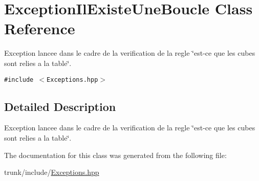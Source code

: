 \hypertarget{classExceptionIlExisteUneBoucle}{
\section{ExceptionIlExisteUneBoucle Class Reference}
\label{classExceptionIlExisteUneBoucle}
}
Exception lancee dans le cadre de la verification de la regle \char`\"{}est-ce que les cubes sont relies a la table\char`\"{}.  


{\tt \#include $<$Exceptions.hpp$>$}



\subsection{Detailed Description}
Exception lancee dans le cadre de la verification de la regle \char`\"{}est-ce que les cubes sont relies a la table\char`\"{}. 

The documentation for this class was generated from the following file:\begin{CompactItemize}
\item 
trunk/include/\hyperlink{Exceptions_8hpp}{Exceptions.hpp}\end{CompactItemize}
